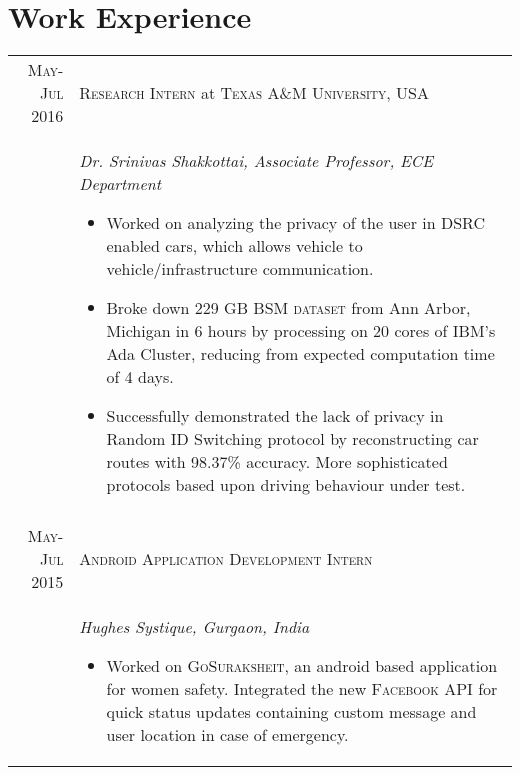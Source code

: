 \documentclass[a4paper,10pt]{article}
\begin{document}
\section{Work Experience}
\centering
\begin{longtable}{r|p{12cm}}
\textsc{May-Jul 2016} & \large \textsc{Research Intern} at \textsc{Texas A\&M University, USA}\\
& \textit{Dr. Srinivas Shakkottai, Associate Professor, ECE Department}
\begin{itemize}
 \item Worked on analyzing the privacy of the user in DSRC enabled cars, which allows vehicle to vehicle/infrastructure communication.
 \item Broke down 229 GB \textsc{BSM dataset} from Ann Arbor, Michigan in 6 hours by processing on 20 cores of IBM's Ada Cluster, reducing from expected computation time of 4 days.
 \item Successfully demonstrated the lack of privacy in Random ID Switching protocol by reconstructing car routes with 98.37\% accuracy. More sophisticated protocols based upon driving behaviour under test. \vspace*{-\baselineskip}
\end{itemize}
\\
\multicolumn{2}{c}{}\\
\textsc{May-Jul 2015} & \large \textsc{Android Application Development Intern}\\
& \textit{Hughes Systique, Gurgaon, India}
\begin{itemize}
 \item Worked on \textsc{GoSuraksheit}, an android based application for women safety. Integrated the new \textsc{Facebook API} for quick status updates containing custom message and user location in case of emergency. \vspace*{-\baselineskip}
\end{itemize}\\
\end{longtable}
\end{document}
